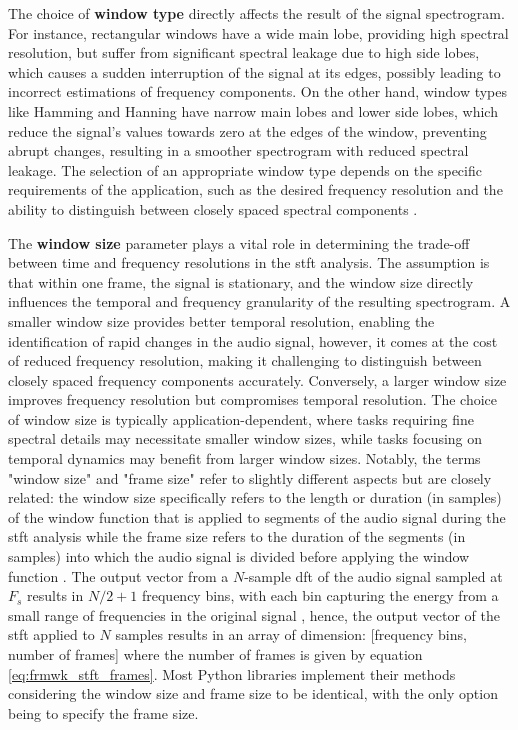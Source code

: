 The choice of \textbf{window type} directly affects the result of the signal spectrogram. For instance, rectangular windows have a wide main lobe, providing high spectral resolution, but suffer from significant spectral leakage due to high side lobes, which causes a sudden interruption of the signal at its edges, possibly leading to incorrect estimations of frequency components. On the other hand, window types like Hamming and Hanning have narrow main lobes and lower side lobes, which reduce the signal's values towards zero at the edges of the window, preventing abrupt changes, resulting in a smoother spectrogram with reduced spectral leakage. The selection of an appropriate window type depends on the specific requirements of the application, such as the desired frequency resolution and the ability to distinguish between closely spaced spectral components \cite{Zoelzer2008}.

The \textbf{window size} parameter plays a vital role in determining the trade-off between time and frequency resolutions in the \gls{stft} analysis. The assumption is that within one frame, the signal is stationary, and the window size directly influences the temporal and frequency granularity of the resulting spectrogram. A smaller window size provides better temporal resolution, enabling the identification of rapid changes in the audio signal, however, it comes at the cost of reduced frequency resolution, making it challenging to distinguish between closely spaced frequency components accurately. Conversely, a larger window size improves frequency resolution but compromises temporal resolution. The choice of window size is typically application-dependent, where tasks requiring fine spectral details may necessitate smaller window sizes, while tasks focusing on temporal dynamics may benefit from larger window sizes. Notably, the terms "window size" and "frame size" refer to slightly different aspects but are closely related: the window size specifically refers to the length or duration (in samples) of the window function that is applied to segments of the audio signal during the \gls{stft} analysis while the frame size refers to the duration of the segments (in samples) into which the audio signal is divided before applying the window function \cite{Smith2013}. The output vector from a $N$-sample \gls{dft} of the audio signal sampled at $F_s$ results in $N/2 +1$ frequency bins, with each bin capturing the energy from a small range of frequencies in the original signal \cite{Abreha2014}, hence, the output vector of the \gls{stft} applied to $N$ samples results in an array of dimension: [frequency bins, number of frames] where the number of frames is given by equation \ref{eq:frmwk_stft_frames}. Most Python libraries implement their methods considering the window size and frame size to be identical, with the only option being to specify the frame size.

